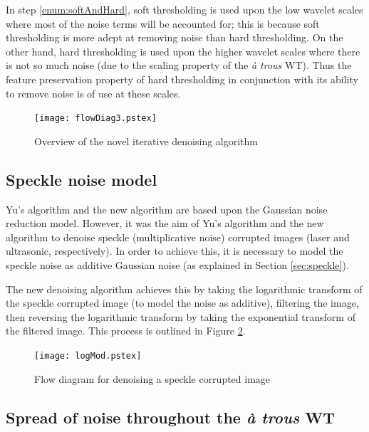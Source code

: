 \documentclass[12pt]{report}
\begin{document}
In step \ref{enum:softAndHard}, soft thresholding is used upon the low wavelet scales where most of the
noise terms will be accounted for; this is because soft thresholding is more adept at removing noise
than hard thresholding. On the other hand, hard thresholding is used upon the higher wavelet scales where
there is not so much noise (due to the scaling property of the \emph{\`a trous} WT). Thus
the feature preservation property of hard thresholding in conjunction with its ability to remove noise
is of use at these scales. 

\begin{figure}[!ht]
	\begin{center}
		\texttt{[image: flowDiag3.pstex]}
		\caption{Overview of the novel iterative denoising algorithm}
		\label{ourFlowDiag}
	\end{center}
\end{figure}


\subsection{Speckle noise model}
\label{sec:speckleNoiseModel}
Yu's algorithm and the new algorithm are based upon the Gaussian noise reduction model.
However, it was the aim of Yu's algorithm and the new algorithm to denoise speckle (multiplicative noise) corrupted images 
(laser and ultrasonic, respectively).
In order to achieve this, it is necessary to model the speckle noise as additive Gaussian noise
(as explained in Section \ref{sec:speckle}).

The new denoising algorithm achieves this by taking the logarithmic transform of the speckle corrupted image (to 
model the noise as additive), filtering the 
image, then reversing the logarithmic transform by taking the exponential transform of the filtered image.
This process is outlined in Figure \ref{logMod}.

\begin{figure}[!ht]
	\begin{center}
		\texttt{[image: logMod.pstex]}
		\caption{Flow diagram for denoising a speckle corrupted image}
		\label{logMod}
	\end{center}
\end{figure}

\subsection{Spread of noise throughout the \emph{\`a trous} WT}
\label{sec:simNoiseImage}
 
\end{document}
